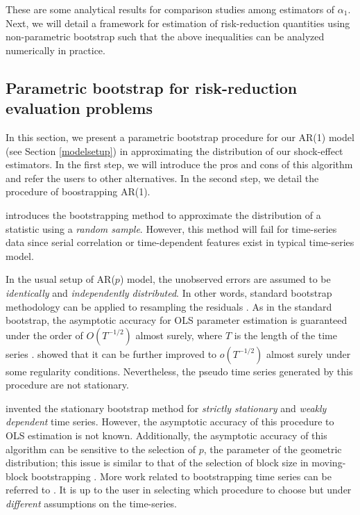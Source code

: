 \documentclass[11pt]{article}
\theoremstyle{definition}
\begin{document}
 These are some analytical results for comparison studies among estimators of $\alpha_1$. Next, we will detail a framework for estimation of risk-reduction  quantities using non-parametric bootstrap such that the above inequalities can be  analyzed numerically in practice.


\subsection{Parametric bootstrap for risk-reduction evaluation problems}

In this section, we present a parametric bootstrap procedure for our AR(1) model (see Section \ref{modelsetup}) in approximating the distribution of our shock-effect estimators. In the first step, we will introduce the pros and cons of this algorithm and refer the users to other alternatives. In the second step, we detail the procedure of boostrapping AR(1).

\citet{efron} introduces the bootstrapping method to approximate the distribution of a statistic using a \emph{random sample}. However, this method will fail for time-series data since serial correlation or time-dependent features exist in typical time-series model. 

In the usual setup of AR($p$) model, the unobserved errors are assumed to be \emph{identically} and \emph{independently distributed}. In other words, standard bootstrap methodology can be applied to resampling the residuals \citep{efron1986bootstrap}. As in the standard bootstrap, the asymptotic accuracy for OLS parameter estimation is guaranteed under the order of $O(T^{-1/2})$ almost surely, where $T$ is the length of the time series \citep{berkowitz2000recent}. \citet{bose1988edgeworth} showed that it can be further improved to $o(T^{-1/2})$ almost surely under some regularity conditions. Nevertheless, the pseudo time series generated by this procedure are not stationary. 

\citet{politis1994stationary} invented the stationary bootstrap method for \emph{strictly stationary} and \emph{weakly dependent} time series. However, the asymptotic accuracy of this procedure to OLS estimation is not known. Additionally, the asymptotic accuracy of this algorithm can be sensitive to the selection of $p$, the parameter of the geometric distribution; this issue is similar to that of the selection of block size in moving-block bootstrapping \citep{kunsch1989jackknife, liu1992moving}.  More work related to bootstrapping time series  can be referred to \citet{berkowitz2000recent}. It is up to the user in selecting which procedure to choose but under \emph{different} assumptions on the time-series.
\end{document}
